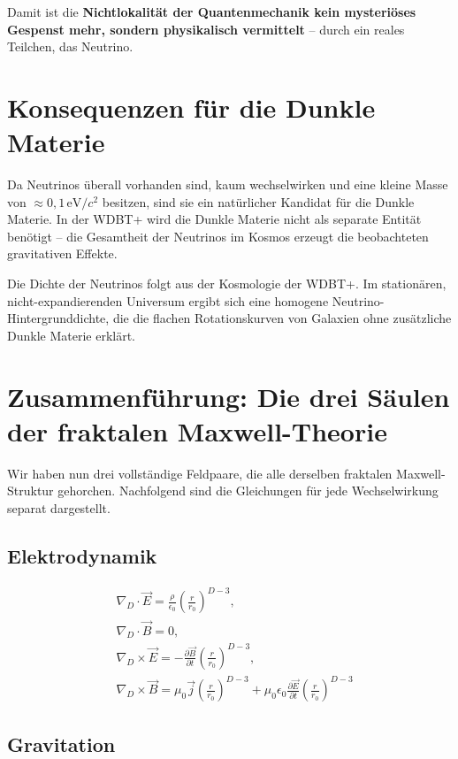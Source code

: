 \documentclass[12pt,a4paper]{article}
\begin{document}
Damit ist die \textbf{Nichtlokalität der Quantenmechanik kein mysteriöses Gespenst mehr, sondern physikalisch vermittelt} – durch ein reales Teilchen, das Neutrino.

\section{Konsequenzen für die Dunkle Materie}

Da Neutrinos überall vorhanden sind, kaum wechselwirken und eine kleine Masse von \(\approx 0,1 \, \text{eV}/c^2\) besitzen, sind sie ein natürlicher Kandidat für die Dunkle Materie. In der WDBT+ wird die Dunkle Materie nicht als separate Entität benötigt – die Gesamtheit der Neutrinos im Kosmos erzeugt die beobachteten gravitativen Effekte.

Die Dichte der Neutrinos folgt aus der Kosmologie der WDBT+. Im stationären, nicht-expandierenden Universum ergibt sich eine homogene Neutrino-Hintergrunddichte, die die flachen Rotationskurven von Galaxien ohne zusätzliche Dunkle Materie erklärt.

\section{Zusammenführung: Die drei Säulen der fraktalen Maxwell-Theorie}

Wir haben nun drei vollständige Feldpaare, die alle derselben fraktalen Maxwell-Struktur gehorchen. Nachfolgend sind die Gleichungen für jede Wechselwirkung separat dargestellt.

\subsection*{Elektrodynamik}

\[
\begin{aligned}
&\nabla_D \cdot \vec{E} = \frac{\rho}{\epsilon_0} \left( \frac{r}{r_0} \right)^{D-3}, \\
&\nabla_D \cdot \vec{B} = 0, \\
&\nabla_D \times \vec{E} = -\frac{\partial \vec{B}}{\partial t} \left( \frac{r}{r_0} \right)^{D-3}, \\
&\nabla_D \times \vec{B} = \mu_0 \vec{j} \left( \frac{r}{r_0} \right)^{D-3} + \mu_0 \epsilon_0 \frac{\partial \vec{E}}{\partial t} \left( \frac{r}{r_0} \right)^{D-3}
\end{aligned}
\]

\subsection*{Gravitation}
\end{document}
